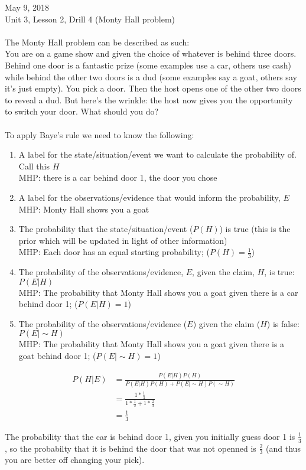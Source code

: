 \documentclass[final]{article}
\begin{document}
\noindent May 9, 2018\\
Unit 3, Lesson 2, Drill 4 (Monty Hall problem)
\\
\\
The Monty Hall problem can be described as such:\\
You are on a game show and given the choice of whatever is behind three doors. Behind one door is a fantastic prize (some examples use a car, others use cash) while behind the other two doors is a dud (some examples say a goat, others say it's just empty). You pick a door. Then the host opens one of the other two doors to reveal a dud. But here's the wrinkle: the host now gives you the opportunity to switch your door. What should you do?\\
\\
To apply Baye's rule we need to know the following: 
\begin{enumerate}
\item A label for the state/situation/event we want to calculate the probability of.  Call this $H$\\
MHP: there is a car behind door 1, the door you chose
\item A label for the observations/evidence that would inform the probability, $E$\\
MHP: Monty Hall shows you a goat
\item The probability that the state/situation/event ($P(H)$) is true (this is the prior which will be updated in light of other information)\\
MHP: Each door has an equal starting probability; ($P(H)=\frac{1}{3}$)
\item The probability of the observations/evidence, $E$, given the claim, $H$, is true: $P(E|H)$\\
MHP: The probability that Monty Hall shows you a goat given there is a car behind door 1; ($P(E|H)=1$)
\item The probability of the observations/evidence ($E$) given the claim ($H$) is false: $P(E| \sim H)$\\
MHP: The probability that Monty Hall shows you a goat given there is a goat behind door 1; ($P(E| \sim H)=1$)
\end{enumerate}

\begin{align}
P(H|E)&=\frac{P(E|H)P(H)}{P(E|H)P(H)+P(E|\sim H)P(\sim H)}\\
&=\frac{1*\frac{1}{3}}{1*\frac{1}{3}+1*\frac{2}{3}}\\
&=\frac{1}{3}
\end{align}

\noindent The probability that the car is behind door 1, given you initially guess door 1 is $\frac{1}{3}$, so the probabilty that it is behind the door that was not openned is $\frac{2}{3}$ (and thus you are better off changing your pick).
\end{document}
